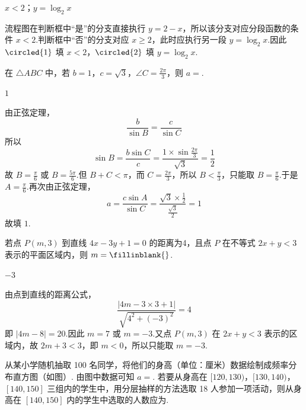 \begin{answer}
\(x < 2\)；\(y = \log_{2}x\)
\end{answer}

\begin{solution}
流程图在判断框中“是”的分支直接执行 \(y=2-x\)，所以该分支对应分段函数的条件 \(x<2\).判断框中“否”的分支对应 \(x\geqslant2\)，此时应执行另一段 \(y=\log_{2}x\).因此 \(\circled{1}\) 填 \(x<2\)，\(\circled{2}\) 填 \(y=\log_{2}x\).
\end{solution}

\begin{problem}
在 \(\triangle ABC\) 中，若 \(b = 1\)，\(c = \sqrt{3}\)，\(\angle C = \frac{2\pi}{3}\)，则 \(a = \)\fillinblank{}.
\end{problem}

\begin{answer}
\(1\)
\end{answer}

\begin{solution}
由正弦定理，
\[
\frac{b}{\sin B}=\frac{c}{\sin C}
\]
所以
\[
\sin B=\frac{b\sin C}{c}=\frac{1\times\sin\frac{2\pi}{3}}{\sqrt{3}}=\frac{1}{2}
\]
故 \(B=\frac{\pi}{6}\) 或 \(B=\frac{5\pi}{6}\).但 \(B+C<\pi\)，而 \(C=\frac{2\pi}{3}\)，所以 \(B<\frac{\pi}{3}\)，只能取 \(B=\frac{\pi}{6}\).于是 \(A=\frac{\pi}{6}\).再次由正弦定理，
\[
a=\frac{c\sin A}{\sin C}=\frac{\sqrt{3}\times\frac{1}{2}}{\frac{\sqrt{3}}{2}}=1
\]
故填 \(1\).
\end{solution}

\begin{problem}
若点 \(P(m,3)\) 到直线 \(4x - 3y + 1 = 0\) 的距离为4，且点 \(P\) 在不等式 \(2x + y < 3\) 表示的平面区域内，则 \(m =\fillinblank{}\).
\end{problem}

\begin{answer}
\(-3\)
\end{answer}

\begin{solution}
由点到直线的距离公式，
\[
\frac{|4m-3\times3+1|}{\sqrt{4^2+(-3)^2}}=4
\]
即 \(|4m-8|=20\).因此 \(m=7\) 或 \(m=-3\).又点 \(P(m,3)\) 在 \(2x+y<3\) 表示的区域内，故 \(2m+3<3\)，即 \(m<0\)，所以只能取 \(m=-3\).
\end{solution}

\begin{problem}
从某小学随机抽取 100 名同学，将他们的身高（单位：厘米）数据绘制成频率分布直方图（如图）.
由图中数据可知 \(a =\)\fillinblank{}. 若要从身高在 \([120, 130)\)，\([130, 140)\)，\([140, 150]\) 三组内的学生中，用分层抽样的方法选取 18 人参加一项活动，则从身高在 \([140, 150]\) 内的学生中选取的人数应为\fillinblank{}.
\end{problem}

